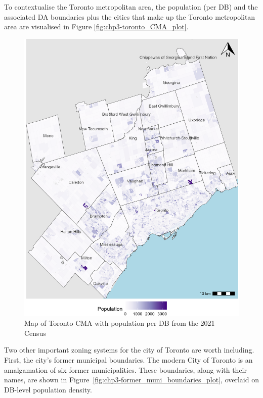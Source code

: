 \documentclass[
11pt, %
oneside, %
english, %
singlespacing, %
]{macthesis} %
\begin{document}
To contextualise the Toronto metropolitan area, the population (per DB) and the associated DA boundaries plus the cities that make up the Toronto metropolitan area are visualised in Figure \ref{fig:chp3-toronto_CMA_plot}.

\begin{figure}

{\centering \includegraphics[width=6in]{./data/figures/chp3-toronto_CMA_plot} 

}

\caption{\label{fig:chp3-toronto_CMA_plot}Map of Toronto CMA with population per DB from the 2021 Census}\label{fig:unnamed-chunk-42}
\end{figure}

Two other important zoning systems for the city of Toronto are worth including. First, the city's former municipal boundaries. The modern City of Toronto is an amalgamation of six former municipalities. These boundaries, along with their names, are shown in Figure~\ref{fig:chp3-former_muni_boundaries_plot}, overlaid on DB-level population density.
\end{document}
